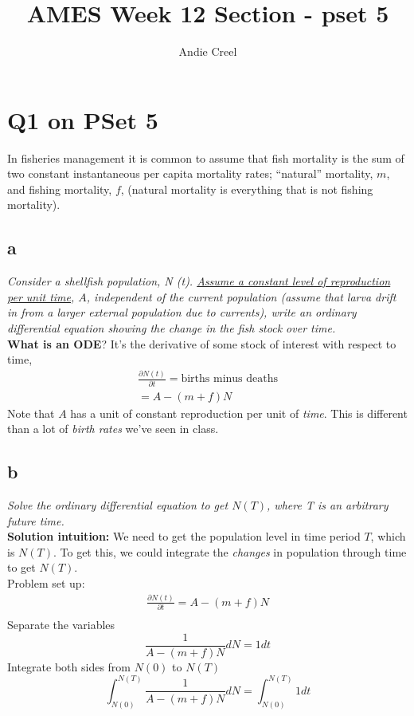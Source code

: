 \documentclass{article}
\title{AMES Week 12 Section - pset 5}
\author{Andie Creel}
\begin{document}
\maketitle

\section{Q1 on PSet 5}
In fisheries management it is common to assume that fish mortality is the sum of two constant instantaneous per capita mortality rates; “natural” mortality, $m$, and fishing mortality, $f $, (natural mortality is everything that is not fishing mortality). 

\subsection{a}
\textit{Consider a shellfish population, N (t). \underline{Assume a constant level of reproduction per unit time}, $A$, independent of the current population (assume that larva drift in from a larger external population due to currents), write an ordinary differential equation showing the change in the fish stock over time. }\\

\textbf{What is an ODE}? It's the derivative of some stock of interest with respect to time, 
\begin{align*}
    \frac{\partial N(t)}{ \partial t} = \text{births minus deaths}\\
    = A - (m +f)N
\end{align*}
Note that $A$ has a unit of constant reproduction per unit of \textit{time}. This is different than a lot of \textit{birth rates} we've seen in class. 

\subsection{b}
\textit{Solve the ordinary differential equation to get $N(T)$, where T is an arbitrary future time.}\\

\textbf{Solution intuition:} We need to get the population level in time period $T$, which is $N(T)$. To get this, we could integrate the \textit{changes} in population through time to get $N(T)$. \\

Problem set up:
\begin{align*}
    \frac{\partial N(t)}{\partial t} = A - (m +f)N \\
\end{align*}
Separate the variables 
\[ \frac{1}{A - (m+f)N} d N = 1 dt\]
Integrate both sides from $N(0)$ to $N(T)$
\[\int_{N(0)}^{N(T)} \frac{1}{A - (m+f)N} d N = \int_{N(0)}^{N(T)} 1 dt\]
\end{document}
